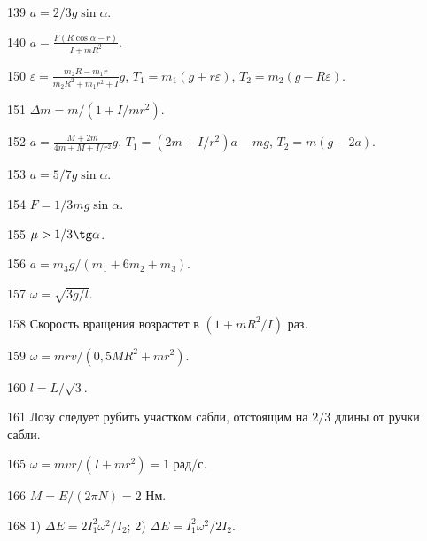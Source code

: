 \begin{Answer}{139}
$a=2/3g\sin \alpha$.
\end{Answer}
\begin{Answer}{140}
$a = \frac{F(R\cos \alpha - r)}{I + mR^2}$.
\end{Answer}
\begin{Answer}{150}
$\varepsilon = \frac{m_2R - m_1r}{m_2R^2 + m_1r^2 + I}g$, $T_1 = m_1(g+r\varepsilon)$, $T_2 = m_2(g-R\varepsilon)$.
\end{Answer}
\begin{Answer}{151}
$\Delta m = m/(1+I/mr^2)$.
\end{Answer}
\begin{Answer}{152}
$a = \frac{M+2m}{4m+M+I/r^2}g$, $T_1 = (2m+I/r^2)a - mg$, $T_2=m(g-2a)$.
\end{Answer}
\begin{Answer}{153}
$a=5/7g\sin \alpha$.
\end{Answer}
\begin{Answer}{154}
$F = 1/3 mg \sin \alpha$.
\end{Answer}
\begin{Answer}{155}
$\mu > 1/3 \tg \alpha$.
\end{Answer}
\begin{Answer}{156}
$a = m_3g/(m_1 + 6m_2 +m_3)$.
\end{Answer}
\begin{Answer}{157}
$\omega = \sqrt{3g/l}$.
\end{Answer}
\begin{Answer}{158}
Скорость вращения возрастет в $(1+mR^2/I)$ раз.
\end{Answer}
\begin{Answer}{159}
$\omega = mrv/(0,5MR^2 + mr^2)$.
\end{Answer}
\begin{Answer}{160}
$l = L/\sqrt{3}$.
\end{Answer}
\begin{Answer}{161}
Лозу следует рубить участком сабли, отстоящим на $2/3$ длины от ручки сабли.
\end{Answer}
\begin{Answer}{165}
$\omega = mvr/(I+mr^2) = 1$ рад/с.
\end{Answer}
\begin{Answer}{166}
$M = E / (2 \pi N) = 2$ Нм.
\end{Answer}
\begin{Answer}{168}
1) $\Delta E = 2I_1^2\omega^2/I_2$; 2) $\Delta E = I_1^2\omega^2/2I_2$.
\end{Answer}
